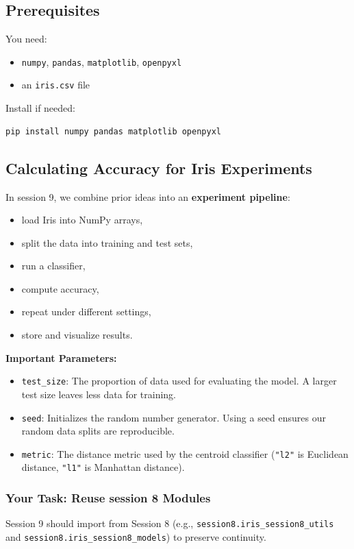 \subsection{Prerequisites}
You need:
\begin{itemize}\setlength{\itemsep}{0pt}
\item \texttt{numpy}, \texttt{pandas}, \texttt{matplotlib}, \texttt{openpyxl}
\item an \texttt{iris.csv} file
\end{itemize}

\noindent
Install if needed:
\begin{verbatim}
pip install numpy pandas matplotlib openpyxl
\end{verbatim}

\newpage
\subsection{Calculating Accuracy for Iris Experiments}

In session 9, we combine prior ideas into an \textbf{experiment pipeline}:
\begin{itemize}\setlength{\itemsep}{0pt}
\item load Iris into NumPy arrays,
\item split the data into training and test sets,
\item run a classifier,
\item compute accuracy,
\item repeat under different settings,
\item store and visualize results.
\end{itemize}

\textbf{Important Parameters:}
\begin{itemize}\setlength{\itemsep}{0pt}
\item \texttt{test\_size}: The proportion of data used for evaluating the model. A larger test size leaves less data for training.
\item \texttt{seed}: Initializes the random number generator. Using a seed ensures our random data splits are reproducible.
\item \texttt{metric}: The distance metric used by the centroid classifier (\texttt{"l2"} is Euclidean distance, \texttt{"l1"} is Manhattan distance).
\end{itemize}

\subsubsection{Your Task: Reuse session 8 Modules}
Session 9 should import from Session 8 (e.g., \texttt{session8.iris\_session8\_utils} and \texttt{session8.iris\_session8\_models}) to preserve continuity.

